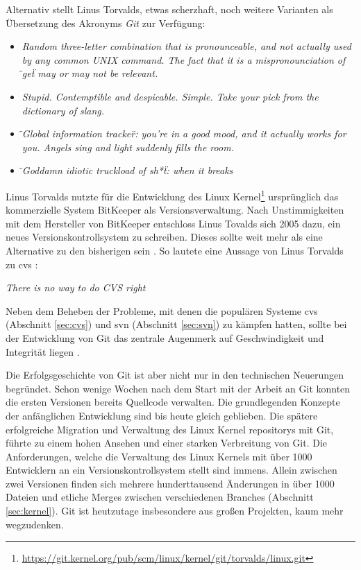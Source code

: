 Alternativ stellt Linus Torvalds, etwas scherzhaft, noch weitere Varianten als
Übersetzung des Akronyms \textit{Git} zur Verf\-ügung\cite{link:gitfaq}:

\begin{itemize}
  \item \textit{\glqq{}Random three-letter combination that is pronounceable,
  and not actually used by any common UNIX command. The fact that it is a
  mispronounciation of \"{}get\"{} may or may not be relevant.\grqq{}}
  \item \textit{\glqq{}Stupid. Contemptible and despicable. Simple. Take your
  pick from the dictionary of slang.\grqq{}}
  \item \textit{\glqq{}\"{}Global information tracker\"{}: you're in a good
  mood, and it actually works for you. Angels sing and light suddenly fills the
  room.\grqq{}}
  \item \textit{\glqq{}\"{}Goddamn idiotic truckload of sh*t\"{}: when it
  breaks\grqq{}}
\end{itemize}

Linus Torvalds nutzte für die Entwicklung des Linux
Kernel\footnote{\url{https://git.kernel.org/pub/scm/linux/kernel/git/torvalds/linux.git}}
ursprünglich das kommerzielle System BitKeeper als Versionsverwaltung.  Nach
Unstimmigkeiten mit dem Hersteller von BitKeeper entschloss Linus Tovalds sich
2005 dazu, ein neues Versionskontrollsystem zu schreiben. Dieses sollte weit mehr als eine
Alternative zu den bisherigen sein \cite[S.~13]{gitosp}. So lautete eine
Aussage von Linus Torvalds zu \acrshort{cvs} \cite[S.~385]{cd}:

\begin{center}
\textit{\glqq{}There is no way to do CVS right\grqq{}}\\
\end{center}

Neben dem Beheben der Probleme, mit denen die populären Systeme \acrshort{cvs}
(Abschnitt \ref{sec:cvs}) und \acrshort{svn} (Abschnitt \ref{sec:svn}) zu
kämpfen hatten, sollte bei der Entwicklung von Git das zentrale Augenmerk auf
Geschwindigkeit und Integrität liegen \cite[S.~13]{gitosp}.

Die Erfolgsgeschichte von Git ist aber nicht nur in den technischen Neuerungen
begründet. Schon wenige Wochen nach dem Start mit der Arbeit an Git konnten die
ersten Versionen bereits Quellcode verwalten. Die grundlegenden Konzepte der
anfänglichen Entwicklung sind bis heute gleich geblieben. Die spätere
erfolgreiche Migration und Verwaltung des Linux Kernel \glspl{repository}
mit Git, führte zu einem hohen Ansehen und einer starken Verbreitung von Git.
Die Anforderungen, welche die Verwaltung des Linux Kernels mit über 1000
Entwicklern an ein Versionskontrollsystem stellt sind immens. Allein zwischen
zwei Versionen finden sich mehrere hunderttausend Änderungen in über 1000
Dateien und etliche Merges zwischen verschiedenen Branches (Abschnitt
\ref{sec:kernel}). Git ist heutzutage insbesondere aus großen Projekten,
kaum mehr wegzudenken. \cite[S.~13]{gitosp}


